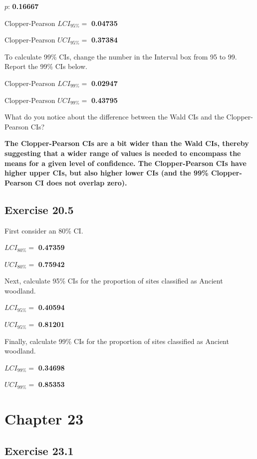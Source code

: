 \documentclass[
  openany]{krantz}
\begin{document}
\(p\): \textbf{0.16667}

Clopper-Pearson \(LCI_{95\%} =\) \textbf{0.04735}

Clopper-Pearson \(UCI_{95\%} =\) \textbf{0.37384}

To calculate 99\% CIs, change the number in the Interval box from 95 to 99.
Report the 99\% CIs below.

Clopper-Pearson \(LCI_{99\%} =\) \textbf{0.02947}

Clopper-Pearson \(UCI_{99\%} =\) \textbf{0.43795}

What do you notice about the difference between the Wald CIs and the Clopper-Pearson CIs?

\textbf{The Clopper-Pearson CIs are a bit wider than the Wald CIs, thereby suggesting that a wider range of values is needed to encompass the means for a given level of confidence. The Clopper-Pearson CIs have higher upper CIs, but also higher lower CIs (and the 99\% Clopper-Pearson CI does not overlap zero).}

\hypertarget{exercise-20.5}{%
\subsection{Exercise 20.5}\label{exercise-20.5}}

First consider an 80\% CI.

\(LCI_{80\%} =\) \textbf{0.47359}

\(UCI_{80\%} =\) \textbf{0.75942}

Next, calculate 95\% CIs for the proportion of sites classified as Ancient woodland.

\(LCI_{95\%} =\) \textbf{0.40594}

\(UCI_{95\%} =\) \textbf{0.81201}

Finally, calculate 99\% CIs for the proportion of sites classified as Ancient woodland.

\(LCI_{99\%} =\) \textbf{0.34698}

\(UCI_{99\%} =\) \textbf{0.85353}

\hypertarget{chapter-23}{%
\section{Chapter 23}\label{chapter-23}}

\hypertarget{exercise-23.1}{%
\subsection{Exercise 23.1}\label{exercise-23.1}}
\end{document}
